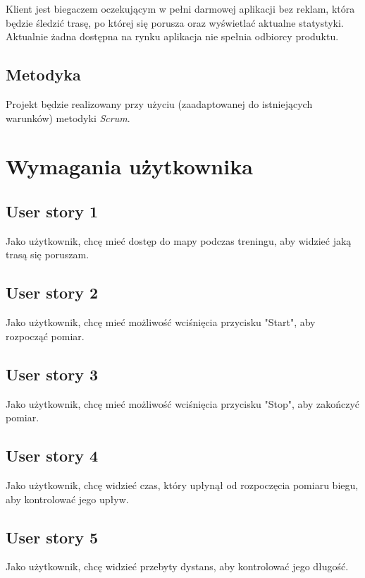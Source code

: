 \documentclass[a4paper]{article}
\begin{document}
Klient jest biegaczem oczekującym w pełni darmowej aplikacji bez reklam, która będzie śledzić trasę, po której się porusza oraz wyświetlać aktualne statystyki. Aktualnie żadna dostępna na rynku aplikacja nie spełnia odbiorcy produktu.

\subsection{Metodyka}

Projekt będzie realizowany przy użyciu (zaadaptowanej do istniejących warunków) metodyki {\em Scrum}.

\section{Wymagania użytkownika}

\subsection{User story 1}
Jako użytkownik, chcę mieć dostęp do mapy podczas treningu, aby widzieć jaką trasą się poruszam.

\subsection{User story 2}
Jako użytkownik, chcę mieć możliwość wciśnięcia przycisku "Start", aby rozpocząć pomiar.

\subsection{User story 3}
Jako użytkownik, chcę mieć możliwość wciśnięcia przycisku "Stop", aby zakończyć pomiar.

\subsection{User story 4}
Jako użytkownik, chcę widzieć czas, który upłynął od rozpoczęcia pomiaru biegu, aby kontrolować jego upływ.

\subsection{User story 5}
Jako użytkownik, chcę widzieć przebyty dystans, aby kontrolować jego długość.
\end{document}
